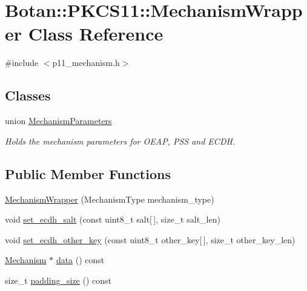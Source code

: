 \hypertarget{class_botan_1_1_p_k_c_s11_1_1_mechanism_wrapper}{}\section{Botan\+:\+:P\+K\+C\+S11\+:\+:Mechanism\+Wrapper Class Reference}
\label{class_botan_1_1_p_k_c_s11_1_1_mechanism_wrapper}


{\ttfamily \#include $<$p11\+\_\+mechanism.\+h$>$}

\subsection*{Classes}
\begin{DoxyCompactItemize}
\item 
union \mbox{\hyperlink{union_botan_1_1_p_k_c_s11_1_1_mechanism_wrapper_1_1_mechanism_parameters}{Mechanism\+Parameters}}
\begin{DoxyCompactList}\small\item\em Holds the mechanism parameters for O\+E\+AP, P\+SS and E\+C\+DH. \end{DoxyCompactList}\end{DoxyCompactItemize}
\subsection*{Public Member Functions}
\begin{DoxyCompactItemize}
\item 
\mbox{\hyperlink{class_botan_1_1_p_k_c_s11_1_1_mechanism_wrapper_ad330d79c0f7c0f57f08be67d6944b504}{Mechanism\+Wrapper}} (Mechanism\+Type mechanism\+\_\+type)
\item 
void \mbox{\hyperlink{class_botan_1_1_p_k_c_s11_1_1_mechanism_wrapper_a09212081c178d1d572da012514e8959b}{set\+\_\+ecdh\+\_\+salt}} (const uint8\+\_\+t salt\mbox{[}$\,$\mbox{]}, size\+\_\+t salt\+\_\+len)
\item 
void \mbox{\hyperlink{class_botan_1_1_p_k_c_s11_1_1_mechanism_wrapper_ad45f1d153bbf17d29abcf8cd7b793cab}{set\+\_\+ecdh\+\_\+other\+\_\+key}} (const uint8\+\_\+t other\+\_\+key\mbox{[}$\,$\mbox{]}, size\+\_\+t other\+\_\+key\+\_\+len)
\item 
\mbox{\hyperlink{struct_c_k___m_e_c_h_a_n_i_s_m}{Mechanism}} $\ast$ \mbox{\hyperlink{class_botan_1_1_p_k_c_s11_1_1_mechanism_wrapper_a9207102ddf27379a3cdf0331e65feb9d}{data}} () const
\item 
size\+\_\+t \mbox{\hyperlink{class_botan_1_1_p_k_c_s11_1_1_mechanism_wrapper_a4bab63cb5349bfbe2ed8485de3182733}{padding\+\_\+size}} () const
\end{DoxyCompactItemize}
